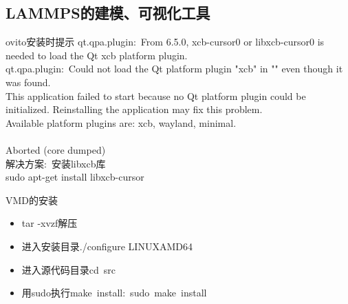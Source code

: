 \documentclass[10pt,a4paper]{article}
\begin{document}
\subsection{{\rm LAMMPS}的建模、可视化工具}
\textrm{ovito}安装时提示
\textrm{qt.qpa.plugin:~From 6.5.0, xcb-cursor0 or libxcb-cursor0 is needed to load the Qt xcb platform plugin.\\
qt.qpa.plugin:~Could not load the Qt platform plugin "xcb" in "" even though it was found.\\
This application failed to start because no Qt platform plugin could be initialized. Reinstalling the application may fix this problem.\\ 
Available platform plugins are: xcb, wayland, minimal.\\
\\
Aborted (core dumped)}\\

解决方案:~安装\textrm{libxcb}库\\
\textrm{sudo apt-get install libxcb-cursor}

\textrm{VMD}的安装
\begin{itemize}
	\item \textrm{tar -xvzf}解压
	\item 进入安装目录\textrm{./configure LINUXAMD64}
	\item 进入源代码目录\textrm{cd~src}
	\item 用\textrm{sudo}执行\textrm{make~install}:~\textrm{sudo~make~install}
\end{itemize}
\end{document}
